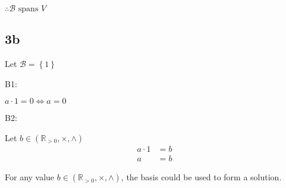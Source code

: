 \documentclass{article}
\begin{document}
$\therefore \mathcal{B} \text{ spans } V$


\subsection*{3b}

Let $\mathcal{B} = \left\{1\right\}$

\noindent
B1:

$a \cdot 1 = 0 \iff a = 0$

\noindent
B2:

Let $b \in \left( \mathbb{R}_{>0}, \times,\wedge \right)$
\begin{align*}
    a \cdot 1 &= b\\
    a &= b
\end{align*}

For any value $b \in \left( \mathbb{R}_{>0}, \times,\wedge \right)$, the basis could be used to form a solution.
\end{document}
